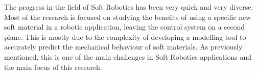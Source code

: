 

The progress in the field of Soft Robotics has been very quick and very diverse. Most of the research is focused on studying the benefits of using a specific new soft material in a robotic application, leaving the control system on a second plane. This is mostly due to the complexity of developing a modelling tool to accurately predict the mechanical behaviour of soft materials. As previously mentioned, this is one of the main challenges in Soft Robotics applications and the main focus of this research.

